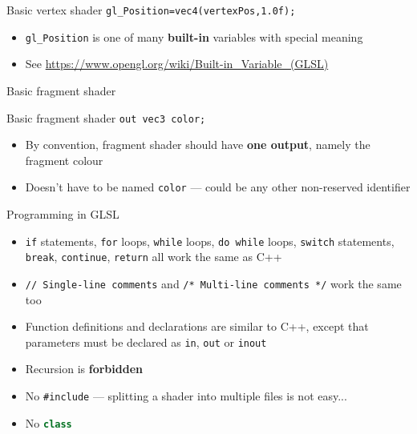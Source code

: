 \begin{frame}{Basic vertex shader}
	\lstinline{gl_Position=vec4(vertexPos,1.0f);}
	\begin{itemize}
		\pause\item \lstinline{gl_Position} is one of many \textbf{built-in} variables with special meaning
		\pause\item See \url{https://www.opengl.org/wiki/Built-in_Variable_(GLSL)}
	\end{itemize}
\end{frame}

\begin{frame}{Basic fragment shader}
	
\end{frame}

\begin{frame}{Basic fragment shader}
	\lstinline{out vec3 color;}
	\begin{itemize}
		\pause\item By convention, fragment shader should have \textbf{one output}, namely the fragment colour
		\pause\item Doesn't have to be named \lstinline{color} --- could be any other non-reserved identifier
	\end{itemize}
\end{frame}

\begin{frame}{Programming in GLSL}
	\begin{itemize}
		\pause\item \lstinline{if} statements, \lstinline{for} loops, \lstinline{while} loops, \lstinline{do while} loops, \lstinline{switch} statements,
			\lstinline{break}, \lstinline{continue}, \lstinline{return} all work the same as C++
		\pause\item \lstinline{// Single-line comments} and \lstinline{/* Multi-line comments */} work the same too
		\pause\item Function definitions and declarations are similar to C++, except that parameters must be declared as
			\lstinline{in}, \lstinline{out} or \lstinline{inout}
		\pause\item Recursion is \textbf{forbidden}
		\pause\item No \texttt{\#include} --- splitting a shader into multiple files is not easy...
		\pause\item No \lstinline[language=C++]{class}
	\end{itemize}
\end{frame}
